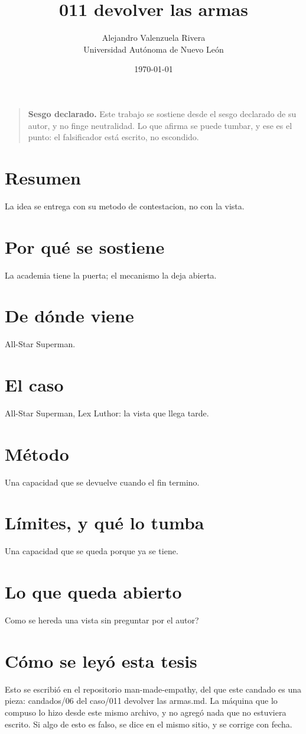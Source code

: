 \documentclass[11pt,a4paper]{article}
\title{011 devolver las armas}
\author{Alejandro Valenzuela Rivera\\\small Universidad Autónoma de Nuevo León}
\date{\today}
\begin{document}
\maketitle

\begin{quote}
\textbf{Sesgo declarado.} Este trabajo se sostiene desde el sesgo declarado de su autor, y no finge neutralidad. Lo que afirma se puede tumbar, y ese es el punto: el falsificador está escrito, no escondido.
\end{quote}

\section*{Resumen}
La idea se entrega con su metodo de contestacion, no con la vista.

\section{Por qué se sostiene}
La academia tiene la puerta; el mecanismo la deja abierta.

\section{De dónde viene}
All-Star Superman.

\section{El caso}
All-Star Superman, Lex Luthor: la vista que llega tarde.

\section{Método}
Una capacidad que se devuelve cuando el fin termino.

\section{Límites, y qué lo tumba}
Una capacidad que se queda porque ya se tiene.

\section{Lo que queda abierto}
\textquestiondown{}Como se hereda una vista sin preguntar por el autor?

\section*{Cómo se leyó esta tesis}
Esto se escribió en el repositorio man-made-empathy, del que este candado es una pieza: candados/06 del caso/011 devolver las armas.md. La máquina que lo compuso lo hizo desde este mismo archivo, y no agregó nada que no estuviera escrito. Si algo de esto es falso, se dice en el mismo sitio, y se corrige con fecha.
\end{document}
